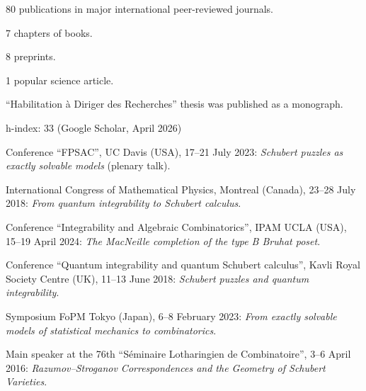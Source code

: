 \begin{cvcompact}
\item 80 publications in major international peer-reviewed journals.
\item 7 chapters of books.
\item 8 preprints.
\item 1 popular science article.
\item ``Habilitation \`a Diriger des Recherches'' thesis was published as a monograph.
\item h-index: 33 (Google Scholar, April 2026)
\end{cvcompact}


\begin{cvcompact}
\item Conference ``FPSAC'', UC Davis (USA), 17--21 July 2023: {\sl Schubert puzzles as exactly solvable models} (plenary talk).
\item International Congress of Mathematical Physics, Montreal (Canada), 23--28 July 2018: {\sl From quantum integrability to Schubert calculus}.
\item Conference ``Integrability and Algebraic Combinatorics'', IPAM UCLA (USA), 15--19 April 2024: {\sl The MacNeille completion of the type B Bruhat poset}.
\item Conference ``Quantum integrability and quantum Schubert calculus'', Kavli Royal Society Centre (UK), 11--13 June 2018: {\sl Schubert puzzles and quantum integrability}.
\item Symposium FoPM Tokyo (Japan), 6--8 February 2023: {\sl From exactly solvable models of statistical mechanics to combinatorics}.
\item Main speaker at the 76th ``S\'eminaire Lotharingien de Combinatoire'', 3--6 April 2016: {\sl Razumov--Stroganov Correspondences and the Geometry of Schubert Varieties}.
\end{cvcompact}

